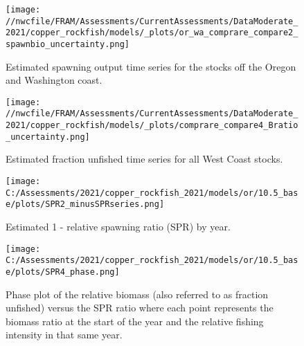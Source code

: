 \documentclass[11pt,
  english,
  a4paper,
]{article}
\begin{document}
\tagmcend\tagstructend


\begin{figure}
\centering
\texttt{[image: //nwcfile/FRAM/Assessments/CurrentAssessments/DataModerate\_2021/copper\_rockfish/models/\_plots/or\_wa\_comprare\_compare2\_spawnbio\_uncertainty.png]}
\caption{Estimated spawning output time series for the stocks off the Oregon and Washington coast.\label{fig:ssb-orwa-compare}}
\end{figure}

\tagmcend\tagstructend


\begin{figure}
\centering
\texttt{[image: //nwcfile/FRAM/Assessments/CurrentAssessments/DataModerate\_2021/copper\_rockfish/models/\_plots/comprare\_compare4\_Bratio\_uncertainty.png]}
\caption{Estimated fraction unfished time series for all West Coast stocks.\label{fig:depl-compare}}
\end{figure}

\tagmcend\tagstructend

\clearpage


\begin{figure}
\centering
\texttt{[image: C:/Assessments/2021/copper\_rockfish\_2021/models/or/10.5\_base/plots/SPR2\_minusSPRseries.png]}
\caption{Estimated 1 - relative spawning ratio (SPR) by year.\label{fig:1-spr}}
\end{figure}

\tagmcend\tagstructend

\clearpage


\begin{figure}
\centering
\texttt{[image: C:/Assessments/2021/copper\_rockfish\_2021/models/or/10.5\_base/plots/SPR4\_phase.png]}
\caption{Phase plot of the relative biomass (also referred to as fraction unfished) versus the SPR ratio where each point represents the biomass ratio at the start of the year and the relative fishing intensity in that same year.\label{fig:phase}}
\end{figure}
\end{document}
